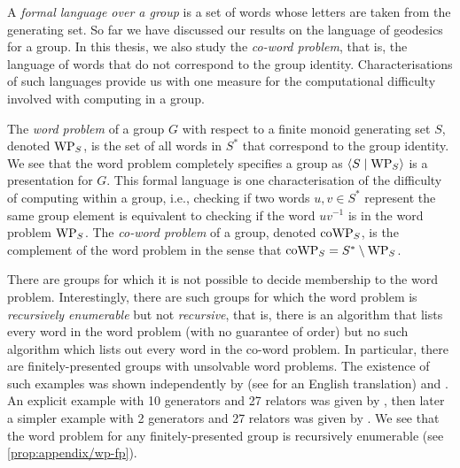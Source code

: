 A \emph{formal language over a group} is a set of words whose letters are taken from the generating set.
So far we have discussed our results on the language of geodesics for a group.
In this thesis, we also study the \emph{co-word problem}, that is, the language of words that do not correspond to the group identity.
Characterisations of such languages provide us with one measure for the computational difficulty involved with computing in a group.

The \emph{word problem} of a group $G$ with respect to a finite monoid generating set $S$, denoted $\mathrm{WP}_S$, is the set of all words in $S^*$ that correspond to the group identity.
We see that the word problem completely specifies a group as $\left\langle S \mid \mathrm{WP}_S \right\rangle$ is a presentation for $G$.
This formal language is one characterisation of the difficulty of computing within a group, i.e., checking if two words $u,v \in S^*$ represent the same group element is equivalent to checking if the word $uv^{-1}$ is in the word problem $\mathrm{WP}_S$.
The \emph{co-word problem} of a group, denoted $\mathrm{coWP}_S$, is the complement of the word problem in the sense that $\mathrm{coWP}_S = S^* \setminus \mathrm{WP}_S$.

There are groups for which it is not possible to decide membership to the word problem.
Interestingly, there are such groups for which the word problem is \emph{recursively enumerable} but not \emph{recursive}, that is, there is an algorithm that lists every word in the word problem (with no guarantee of order) but no such algorithm which lists out every word in the co-word problem.
In particular, there are finitely-presented groups with unsolvable word problems.
The existence of such examples was shown independently by \textcite{novikov1955} (see \cite{novikov1955-translated} for an English translation) and \textcite{boone1959}.
An explicit example with 10 generators and 27 relators was given by \textcite{collins1986}, then later a simpler example with 2 generators and 27 relators was given by \textcite{wang2016}.
We see that the word problem for any finitely-presented group is recursively enumerable (see \cref{prop:appendix/wp-fp}).

